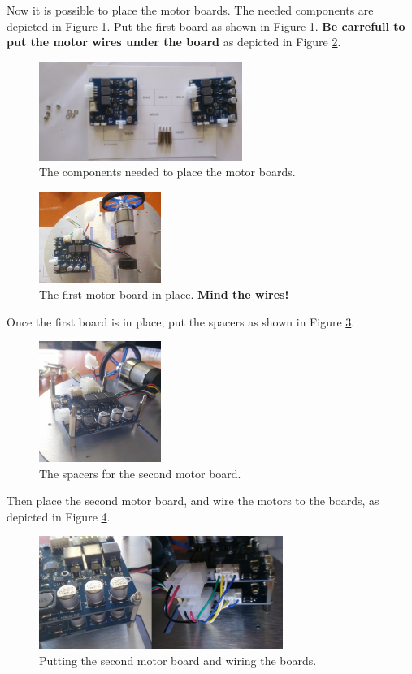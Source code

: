 \documentclass[10pt,a4paper]{report}   %
\begin{document}
Now it is possible to place the motor boards. The needed components are depicted in Figure \ref{fig:19}. Put the first board as shown in Figure \ref{fig:19}. \textbf{Be carrefull to put the motor wires under the board} as depicted in Figure \ref{fig:20}.

\begin{figure}[H]
\center
\includegraphics[width=250px]{images/19.jpg}
\caption{The components needed to place the motor boards.}
\label{fig:19}
\end{figure}

\begin{figure}[H]
\center
\includegraphics[width=150px]{images/20.jpg}
\caption{The first motor board in place. \textbf{Mind the wires!}}
\label{fig:20}
\end{figure}

Once the first board is in place, put the spacers as shown in Figure \ref{fig:21}.

\begin{figure}[H]
\center
\includegraphics[width=150px]{images/21.jpg}
\caption{The spacers for the second motor board.}
\label{fig:21}
\end{figure}

Then place the second motor board, and wire the motors to the boards, as depicted in Figure \ref{fig:22}.

\begin{figure}[H]
\center
\includegraphics[width=300px]{images/22.jpg}
\caption{Putting the second motor board and wiring the boards.}
\label{fig:22}
\end{figure}
\end{document}
